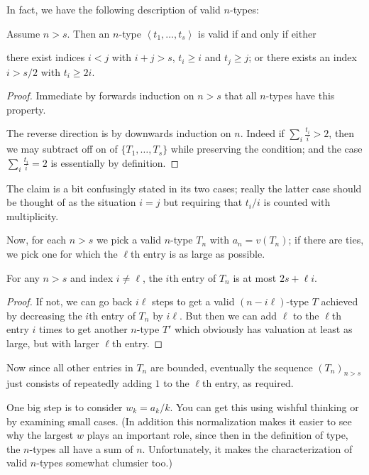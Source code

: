 In fact, we have the following description of valid $n$-types:
\begin{claim*}
  Assume $n > s$.
  Then an $n$-type $\left< t_1, \dots, t_s \right>$ is valid
  if and only if either
  \begin{itemize}
    \ii there exist indices $i < j$ with $i+j > s$,
    $t_i \ge i$ and $t_j \ge j$; or
    \ii there exists an index $i > s/2$
    with $t_i \ge 2i$.
  \end{itemize}
\end{claim*}
\begin{proof}
  Immediate by forwards induction on $n > s$
  that all $n$-types have this property.

  The reverse direction is by downwards induction on $n$.
  Indeed if $\sum_i \frac{t_i}{i} > 2$,
  then we may subtract off on of $\{T_1, \dots, T_s\}$
  while preserving the condition;
  and the case $\sum_i \frac{t_i}{i} = 2$
  is essentially by definition.
\end{proof}
\begin{remark*}
  The claim is a bit confusingly stated in its two cases;
  really the latter case should be thought of as the situation
  $i=j$ but requiring that $t_i/i$ is counted with multiplicity.
\end{remark*}

Now, for each $n > s$ we pick a valid $n$-type $T_n$
with $a_n = v(T_n)$;
if there are ties, we pick one for which the $\ell$th
entry is as large as possible.
\begin{claim*}
  For any $n > s$ and index $i \neq \ell$,
  the $i$th entry of $T_n$
  is at most $2s + \ell i$.
\end{claim*}
\begin{proof}
  If not, we can go back $i\ell$ steps to get
  a valid $(n-i\ell)$-type $T$
  achieved by decreasing the $i$th entry of $T_n$ by $i \ell$.
  But then we can add $\ell$ to the $\ell$th entry $i$
  times to get another $n$-type $T'$ which obviously
  has valuation at least as large,
  but with larger $\ell$th entry.
\end{proof}

Now since all other entries in $T_n$ are bounded,
eventually the sequence $(T_n)_{n > s}$
just consists of repeatedly
adding $1$ to the $\ell$th entry, as required.

\begin{remark*}
One big step is to consider $w_k = a_k / k$.
You can get this using wishful thinking
or by examining small cases.
(In addition this normalization makes it easier
to see why the largest $w$ plays an important role,
since then in the definition of type,
the $n$-types all have a sum of $n$.
Unfortunately, it makes the characterization
of valid $n$-types somewhat clumsier too.)
\end{remark*}

